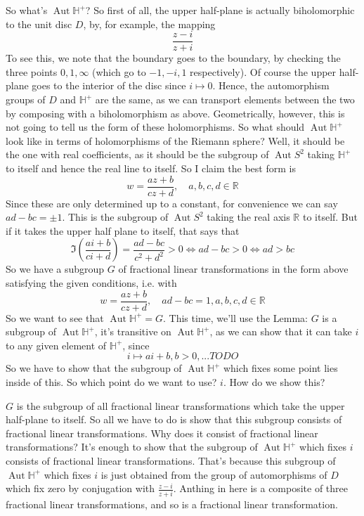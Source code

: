 \documentclass{article}
\newcommand{\mbb}[1]{\mathbb{#1}}
\DeclareMathOperator{\Aut}{Aut}
\begin{document}
So what's \(\Aut\mbb{H}^+\)? So first of all, the upper half-plane is actually biholomorphic to the unit disc \(D\), by, for example, the mapping
\begin{equation}\frac{z - i}{z + i}\end{equation}
To see this, we note that the boundary goes to the boundary, by checking the three points \(0, 1, \infty\) (which go to \(-1, -i, 1\) respectively). Of course the upper half-plane goes to the interior of the disc since \(i \mapsto 0\). Hence, the automorphism groups of \(D\) and \(\mbb{H}^+\) are the same, as we can transport elements between the two by composing with a biholomorphism as above. Geometrically, however, this is not going to tell us the form of these holomorphisms. So what should \(\Aut\mbb{H}^+\) look like in terms of holomorphisms of the Riemann sphere? Well, it should be the one with real coefficients, as it should be the subgroup of \(\Aut S^2\) taking \(\mbb{H}^+\) to itself and hence the real line to itself. So I claim the best form is
\begin{equation}w = \frac{az + b}{cz + d}, \quad a, b, c, d \in \mbb{R}\end{equation}
Since these are only determined up to a constant, for convenience we can say \(ad - bc = \pm 1\). This is the subgroup of \(\Aut S^2\) taking the real axis \(\mbb{R}\) to itself. But if it takes the upper half plane to itself, that says that
\begin{equation}\Im\left(\frac{ai + b}{ci + d}\right) = \frac{ad - bc}{c^2 + d^2} > 0 \iff ad - bc > 0 \iff ad > bc\end{equation}
So we have a subgroup \(G\) of fractional linear transformations in the form above satisfying the given conditions, i.e. with
\begin{equation}w = \frac{az + b}{cz + d}, \quad ad - bc = 1, a, b, c, d \in \mbb{R}\end{equation}
So we want to see that \(\Aut\mbb{H}^+ = G\). This time, we'll use the Lemma: \(G\) is a subgroup of \(\Aut\mbb{H}^+\), it's transitive on \(\Aut\mbb{H}^+\), as we can show that it can take \(i\) to any given element of \(\mbb{H}^+\), since
\begin{equation}i \mapsto ai + b, b > 0, ... TODO\end{equation}
So we have to show that the subgroup of \(\Aut\mbb{H}^+\) which fixes some point lies inside of this. So which point do we want to use? \(i\). How do we show this?

\(G\) is the subgroup of all fractional linear transformations which take the upper half-plane to itself. So all we have to do is show that this subgroup consists of fractional linear transformations. Why does it consist of fractional linear transformations? It's enough to show that the subgroup of \(\Aut\mbb{H}^+\) which fixes \(i\) consists of fractional linear transformations. That's because this subgroup of \(\Aut\mbb{H}^+\) which fixes \(i\) is just obtained from the group of automorphisms of \(D\) which fix zero by conjugation with \(\frac{z - i}{z + i}\). Anthing in here is a composite of three fractional linear transformations, and so is a fractional linear transformation.
\end{document}
